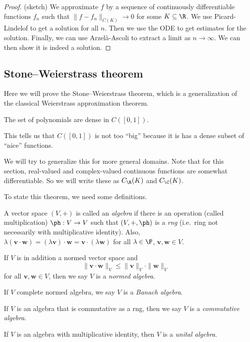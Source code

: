 \documentclass[a4paper]{article}
\begin{document}
\begin{proof}(sketch)
  We approximate $f$ by a sequence of continuously differentiable functions $f_n$ such that $\|f - f_n\|_{C(K)} \to 0$ for some $K\subseteq \R$. We use Picard-Lindelof to get a solution for all $n$. Then we use the ODE to get estimates for the solution. Finally, we can use Arzel\`a-Ascoli to extract a limit as $n \to \infty$. We can then show it is indeed a solution.
\end{proof}

\subsection{Stone--Weierstrass theorem}
Here we will prove the Stone--Weierstrass theorem, which is a generalization of the classical Weierstrass approximation theorem.
\begin{thm}
  The set of polynomials are dense in $C([0, 1])$.
\end{thm}
This tells us that $C([0, 1])$ is not too ``big'' because it is has a dense subset of ``nice'' functions.

We will try to generalize this for more general domains. Note that for this section, real-valued and complex-valued continuous functions are somewhat differentiable. So we will write these as $C_{\R}(K)$ and $C_{\C}(K)$.

To state this theorem, we need some definitions.

\begin{defi}[Algebra]
  A vector space $(V, +)$ is called an \emph{algebra} if there is an operation (called multiplication) $\ph: V \to V$ such that $(V, +, \ph)$ is a \emph{rng} (i.e.\ ring not necessarily with multiplicative identity). Also, $\lambda(\mathbf{v}\cdot \mathbf{w}) = (\lambda \mathbf{v})\cdot \mathbf{w} = \mathbf{v}\cdot (\lambda \mathbf{w})$ for all $\lambda \in \F$, $\mathbf{v}, \mathbf{w} \in V$.

  If $V$ is in addition a normed vector space and
  \[
    \|\mathbf{v}\cdot \mathbf{w}\|_V \leq \|\mathbf{v}\|_V \cdot \|\mathbf{w}\|_V
  \]
  for all $\mathbf{v}, \mathbf{w} \in V$, then we say $V$ is a \emph{normed algebra}.

  If $V$ complete normed algebra, we say $V$ is a \emph{Banach algebra}.

  If $V$ is an algebra that is commutative as a rng, then we say $V$ is a \emph{commutative algebra}.

  If $V$ is an algebra with multiplicative identity, then $V$ is a \emph{unital algebra}.
\end{defi}
\end{document}
